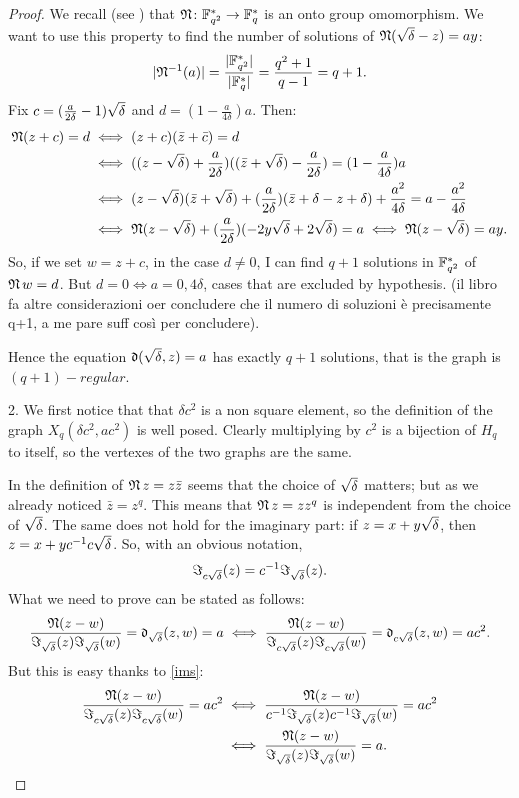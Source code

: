\begin{theorem}
\begin{proof}
We recall (see \cite{lidl1994introduction}) that $\mathfrak{N}\colon {\mathbb F}_{q^2}^{*} \to {\mathbb F}_q^{*}$ is an onto group omomorphism.
We want to use this property to find the number of solutions of $\operatorname{\mathfrak{N}} (\sqrt{\delta} - z) = ay$:
\begin{equation}
	\lvert \mathfrak{N}^{-1}(a)\rvert=\frac{\lvert{\mathbb F}_{q^2}^{*}\rvert}{\lvert{\mathbb F}_q^{*}\rvert}=\frac{q^2+1}{q-1}=q+1.
\end{equation}
Fix $c=(\frac{a}{2\delta}-1)\sqrt{\delta}$ and $d=(1-\frac{a}{4\delta})a$. Then:
\begin{align*}
	\operatorname{\mathfrak{N}} (z+c) = d &\iff (z+c)(\bar{z}+\bar{c})=d \\
					&\iff ((z-\sqrt{\delta})+\frac{a}{2\delta})((\bar{z}+\sqrt{\delta})-\frac{a}{2\delta})=(1-\frac{a}{4\delta})a \\
					&\iff (z-\sqrt{\delta})(\bar{z}+\sqrt{\delta})+(\frac{a}{2\delta})(\bar{z}+\delta-z+\delta)+\frac{a^2}{4\delta}=a-\frac{a^2}{4\delta} \\
					&\iff \operatorname{\mathfrak{N}} (z-\sqrt{\delta})+(\frac{a}{2\delta})(-2y\sqrt{\delta} +2\sqrt{\delta})=a \iff \operatorname{\mathfrak{N}} (z - \sqrt{\delta}) = ay.
\end{align*}
So, if we set $w=z+c$, in the case $d\neq 0$, I can find $q+1$ solutions in ${\mathbb F}_{q^2}^{*}$ of $\operatorname{\mathfrak{N}} w = d$.
But $d=0 \iff a=0,4\delta$, cases that are excluded by hypothesis.
(il libro fa altre considerazioni oer concludere che il numero di soluzioni è precisamente q+1, a me pare suff così per concludere).

Hence the equation $\operatorname{\mathfrak{d}} (\sqrt{\delta}, z)=a$ has exactly $q+1$ solutions, that is the graph is $(q+1)-regular$.

2. We first notice that that $\delta c^2$ is a non square element, so the definition of the graph $X_q(\delta c^2, a c^2)$
is well posed. Clearly multiplying by $c^2$ is a bijection of $H_q$ to itself, so the vertexes of the two graphs are the same.

In the definition of $\operatorname{\mathfrak{N}} z = z \bar{z}$ seems that the choice of $\sqrt{\delta}$ matters; but as we already noticed $\bar{z}=z^q$.
This means that $\operatorname{\mathfrak{N}} z = z z^q$ is independent from the choice of $\sqrt{\delta}$. The same does not hold for the imaginary part:
if $z=x+y\sqrt{\delta}$, then $z=x+yc^{-1} c \sqrt{\delta} $. So, with an obvious notation, 
\begin{equation} \label{ims}
	\Im_{c\sqrt{\delta}} (z) = c^{-1} \Im_{\sqrt{\delta}} (z).
\end{equation}
What we need to prove can be stated as follows:
\begin{equation*}
	\frac{\operatorname{\mathfrak{N}} (z-w)}{\Im_{\sqrt{\delta}} (z) \Im_{\sqrt{\delta}} (w)}=\operatorname{\mathfrak{d}}_{\sqrt{\delta}} (z,w)=a \iff 
	\frac{\operatorname{\mathfrak{N}} (z-w)}{\Im_{c\sqrt{\delta}} (z) \Im_{c\sqrt{\delta}} (w)}=\operatorname{\mathfrak{d}}_{c\sqrt{\delta}} (z,w)=ac^2.
\end{equation*}
But this is easy thanks to \ref{ims}:
\begin{align*}
	\frac{\operatorname{\mathfrak{N}} (z-w)}{\Im_{c\sqrt{\delta}} (z) \Im_{c\sqrt{\delta}} (w)}=ac^2 &\iff \frac{\operatorname{\mathfrak{N}} (z-w)}{c^{-1}\Im_{\sqrt{\delta}} (z)c^{-1} \Im_{\sqrt{\delta}} (w)}=ac^2 \\
															&\iff \frac{\operatorname{\mathfrak{N}} (z-w)}{\Im_{\sqrt{\delta}} (z) \Im_{\sqrt{\delta}} (w)}=a.
\end{align*}


\end{proof}
\end{theorem}
